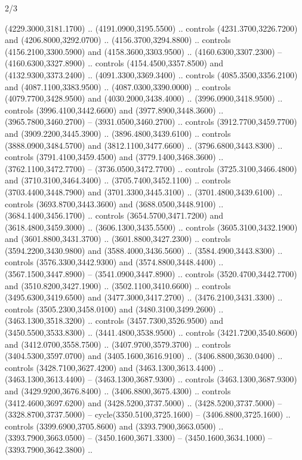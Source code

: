 \begin{flagdescription}{2/3}
\begin{scope}[shift={(0.5\flaglength,0.5)},scale=\flagwidth/130]
\begin{scope}[y=0.01mm, x=0.01mm,shift={(-3365,-2250)}]
  (4229.3000,3181.1700) .. (4191.0900,3195.5500) .. controls
  (4231.3700,3226.7200) and (4206.8000,3292.0700) .. (4156.3700,3294.8800) ..
  controls (4156.2100,3300.5900) and (4158.3600,3303.9500) ..
  (4160.6300,3307.2300) -- (4160.6300,3327.8900) .. controls
  (4154.4500,3357.8500) and (4132.9300,3373.2400) .. (4091.3300,3369.3400) ..
  controls (4085.3500,3356.2100) and (4087.1100,3383.9500) ..
  (4087.0300,3390.0000) .. controls (4079.7700,3428.9500) and
  (4030.2000,3438.4000) .. (3996.0900,3418.9500) .. controls
  (3996.4100,3442.6600) and (3977.8900,3448.3600) .. (3965.7800,3460.2700) --
  (3931.0500,3460.2700) .. controls (3912.7700,3459.7700) and
  (3909.2200,3445.3900) .. (3896.4800,3439.6100) .. controls
  (3888.0900,3484.5700) and (3812.1100,3477.6600) .. (3796.6800,3443.8300) ..
  controls (3791.4100,3459.4500) and (3779.1400,3468.3600) ..
  (3762.1100,3472.7700) -- (3736.0500,3472.7700) .. controls
  (3725.3100,3466.4800) and (3710.3100,3464.3400) .. (3705.7400,3452.1100) ..
  controls (3703.4400,3448.7900) and (3701.3300,3445.3100) ..
  (3701.4800,3439.6100) .. controls (3693.8700,3443.3600) and
  (3688.0500,3448.9100) .. (3684.1400,3456.1700) .. controls
  (3654.5700,3471.7200) and (3618.4800,3459.3000) .. (3606.1300,3435.5500) ..
  controls (3605.3100,3432.1900) and (3601.8800,3431.3700) ..
  (3601.8800,3427.2300) .. controls (3594.2200,3430.9800) and
  (3588.4000,3436.5600) .. (3584.4900,3443.8300) .. controls
  (3576.3300,3442.9300) and (3574.8800,3448.4400) .. (3567.1500,3447.8900) --
  (3541.0900,3447.8900) .. controls (3520.4700,3442.7700) and
  (3510.8200,3427.1900) .. (3502.1100,3410.6600) .. controls
  (3495.6300,3419.6500) and (3477.3000,3417.2700) .. (3476.2100,3431.3300) ..
  controls (3505.2300,3458.0100) and (3480.3100,3499.2600) ..
  (3463.1300,3518.3200) .. controls (3457.7300,3526.9500) and
  (3450.5500,3533.8300) .. (3441.4800,3538.9500) .. controls
  (3421.7200,3540.8600) and (3412.0700,3558.7500) .. (3407.9700,3579.3700) ..
  controls (3404.5300,3597.0700) and (3405.1600,3616.9100) ..
  (3406.8800,3630.0400) .. controls (3428.7100,3627.4200) and
  (3463.1300,3613.4400) .. (3463.1300,3613.4400) -- (3463.1300,3687.9300) ..
  controls (3463.1300,3687.9300) and (3429.9200,3676.8400) ..
  (3406.8800,3675.4300) .. controls (3412.4600,3697.6200) and
  (3428.5200,3737.5000) .. (3428.5200,3737.5000) -- (3328.8700,3737.5000) --
  cycle(3350.5100,3725.1600) -- (3406.8800,3725.1600) .. controls
  (3399.6900,3705.8600) and (3393.7900,3663.0500) .. (3393.7900,3663.0500) --
  (3450.1600,3671.3300) -- (3450.1600,3634.1000) -- (3393.7900,3642.3800) ..

\end{scope}
\end{scope}
\end{flagdescription}
